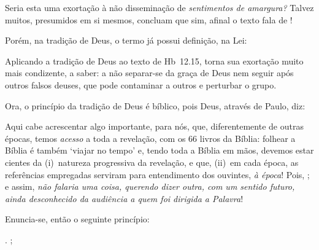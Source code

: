     Seria esta uma exortação à não disseminação de \emph{sentimentos de amargura?}  Talvez  muitos,  presumidos  em  si  mesmos,
    concluam que sim, afinal o texto fala de !

    Porém, na tradição de Deus, o termo já possui definição, na Lei:


    Aplicando a tradição de Deus ao texto de Hb~12.15, torna sua exortação muito mais condizente, a saber: a não separar-se da
    graça de Deus nem seguir após outros falsos deuses, que pode contaminar a outros e perturbar o grupo.

    Ora, o princípio da tradição de Deus é bíblico, pois Deus, através de Paulo, diz:


    Aqui cabe acrescentar algo importante, para nós, que,  diferentemente  de  outras  épocas,  temos  \emph{acesso}  a  toda  a
    revelação, com os 66 livros da Bíblia: folhear a Bíblia é também `viajar no tempo' e, tendo toda a Bíblia  em
    mãos, devemos estar cientes da (i)~natureza progressiva da revelação, e que, (ii)~em cada época, as  referências  empregadas
    serviram  para  entendimento  dos  ouvintes,  \emph{à  época}!  Pois,  ; e assim, \emph{não falaria uma coisa, querendo dizer outra, com um  sentido  futuro,  ainda
    desconhecido da audiência a quem foi dirigida a Palavra}!
    
    Enuncia-se, então o seguinte princípio:

    \begin{PRI}
        \label{pri.palavra}
        . ;  
    \end{PRI}

